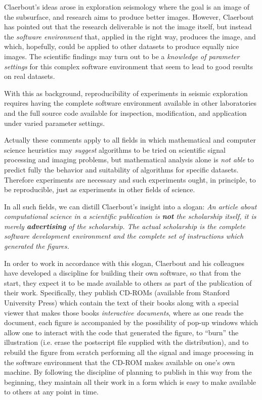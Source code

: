 Claerbout's ideas arose in exploration seismology where the goal is an image of the subsurface, and
research  aims to produce better images. However, Claerbout has pointed
out that the research deliverable is
not the image itself, but instead the {\it software environment} that, applied in the right
way, produces the image, and which, hopefully, could be applied to other datasets to
produce equally nice images. The scientific findings may turn out to be a {\it
knowledge of parameter settings} for this complex software environment that seem to
lead to good results on real datasets.

With this as background, reproducibility of experiments in seismic exploration requires  having the
complete software environment available in other  laboratories and the full source
code available for inspection,  modification, and application under varied parameter
settings.  

Actually these comments apply to all fields in which mathematical and
computer science heuristics may {\it suggest} algorithms to be tried on scientific signal
processing and imaging problems, but mathematical analysis alone is {\it not able} to
predict fully the behavior and suitability of algorithms for specific datasets.  
Therefore experiments are necessary and such experiments ought, in principle, to be
reproducible, just as experiments in other fields of science.

In all such fields, we can distill Claerbout's insight into a slogan: 
{\it An article about computational science in a
scientific publication is {\bf not} the scholarship itself, it is merely {\bf
advertising} of the scholarship.  The actual scholarship is the complete software
development environment and the complete set of instructions which generated the
figures.}
   
In order to work in accordance with this
slogan, Claerbout and his colleagues have developed a discipline for building their own
software, so that from the start, they expect it to be made available to others as
part of the publication of their work.  Specifically, they publish CD-ROMs
(available from Stanford University Press) which contain the text of their books
along with a special viewer that makes those books {\it interactive documents},
where as one reads the document, each figure is accompanied by the possibility of
pop-up windows which allow one to interact with the code that generated the figure,
to ``burn'' the illustration (i.e. erase the postscript  file supplied with the
distribution),  and to rebuild the figure from scratch performing all the 
signal and image processing in the software environment that the CD-ROM
makes available on one's own machine.  By
following the discipline of planning to  publish in this way from the beginning,
they maintain all their work  in a form which is easy to make available to others at
any point in time.

